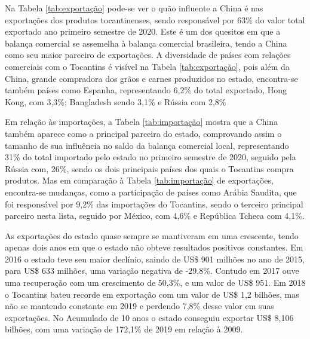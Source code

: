 \par Na Tabela \ref{tab:exportação} pode-se ver o quão influente a China é nas exportações dos produtos tocantinenses, sendo responsável por 63\% do valor total exportado ano primeiro semestre de 2020. Este é um dos quesitos em que a balança comercial se assemelha à balança comercial brasileira, tendo a China como seu maior parceiro de exportações. A diversidade de países com relações comerciais com o Tocantins é visível na Tabela \ref{tab:exportação}, pois além da China, grande compradora dos grãos e carnes produzidos no estado, encontra-se também países como Espanha, representando 6,2\% do total exportado, Hong Kong, com 3,3\%; Bangladesh sendo 3,1\% e Rússia com 2,8\%


\par Em relação às importações, a Tabela \ref{tab:importação} mostra que a China também aparece como a principal parceira do estado, comprovando assim o tamanho de sua influência no saldo da balança comercial local, representando 31\% do total importado pelo estado no primeiro semestre de 2020, seguido pela Rússia com, 26\%, sendo os dois principais países dos quais o Tocantins compra produtos. Mas em comparação à Tabela \ref{tab:importação} de exportações, encontra-se mudanças, como a participação de países como Arábia Saudita, que foi responsável por 9,2\% das importações do Tocantins, sendo o terceiro principal parceiro nesta lista, seguido por México, com 4,6\% e República Tcheca com 4,1\%.



\par As exportações do estado quase sempre se mantiveram em uma crescente, tendo apenas dois anos em que o estado não obteve resultados positivos constantes. Em 2016 o estado teve seu maior declínio, saindo de US\$ 901 milhões no ano de 2015, para US\$ 633 milhões, uma variação negativa de -29,8\%. Contudo em 2017 ouve uma recuperação com um crescimento de 50,3\%, e um valor de US\$ 951. Em 2018 o Tocantins bateu recorde em exportação com um valor de US\$ 1,2 bilhões, mas não se mantendo constante em 2019 e perdendo 7,8\% desse valor em suas exportações. No Acumulado de 10 anos o estado conseguiu exportar US\$ 8,106 bilhões, com uma variação de 172,1\% de 2019 em relação à 2009.

